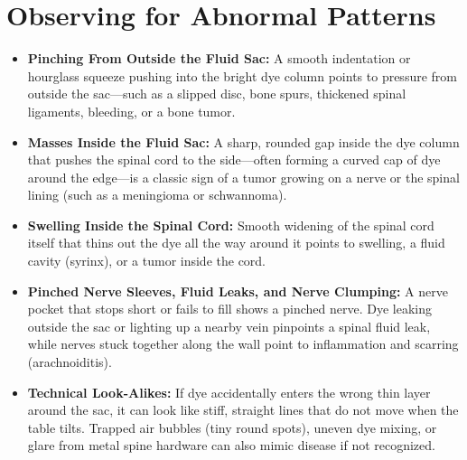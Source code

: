 \section{Observing for Abnormal Patterns}
\begin{itemize}
    \item \textbf{Pinching From Outside the Fluid Sac:} A smooth indentation or hourglass squeeze pushing into the bright dye column points to pressure from outside the sac---such as a slipped disc, bone spurs, thickened spinal ligaments, bleeding, or a bone tumor.
    \item \textbf{Masses Inside the Fluid Sac:} A sharp, rounded gap inside the dye column that pushes the spinal cord to the side---often forming a curved cap of dye around the edge---is a classic sign of a tumor growing on a nerve or the spinal lining (such as a meningioma or schwannoma).
    \item \textbf{Swelling Inside the Spinal Cord:} Smooth widening of the spinal cord itself that thins out the dye all the way around it points to swelling, a fluid cavity (syrinx), or a tumor inside the cord.
    \item \textbf{Pinched Nerve Sleeves, Fluid Leaks, and Nerve Clumping:} A nerve pocket that stops short or fails to fill shows a pinched nerve. Dye leaking outside the sac or lighting up a nearby vein pinpoints a spinal fluid leak, while nerves stuck together along the wall point to inflammation and scarring (arachnoiditis).
    \item \textbf{Technical Look-Alikes:} If dye accidentally enters the wrong thin layer around the sac, it can look like stiff, straight lines that do not move when the table tilts. Trapped air bubbles (tiny round spots), uneven dye mixing, or glare from metal spine hardware can also mimic disease if not recognized.
\end{itemize}

